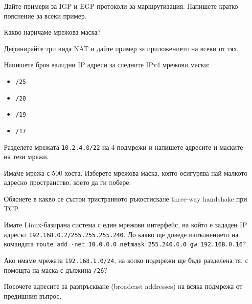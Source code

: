 \begin{questions}
\begin{center}
  \end{center}

  \question Дайте примери за IGP и EGP протоколи за маршрутизация. Напишете
  кратко пояснение за всеки пример.

  \question Какво наричаме мрежова маска?

  \question Дефинирайте три вида NAT и дайте пример за приложението на всеки от
  тях.

  \question Напишете броя валидни IP адреси за следните IPv4 мрежови маски:
  \begin{itemize}
    \item \texttt{/25}
    \item \texttt{/20}
    \item \texttt{/19}
    \item \texttt{/17}
  \end{itemize}

  \question Разделете мрежата \texttt{10.2.4.0/22} на 4 подмрежи и напишете
  адресите и маските на тези мрежи.

  \question Имаме мрежа с 500 хоста. Изберете мрежова маска, която осигурява
  най-малкото адресно пространство, което да ги побере.

  \question Обяснете в какво се състои тристранното ръкостискане
  \foreignlanguage{english}{three-way handshake} при TCP.

  \question Имате Linux-базирана система с един мрежови интерфейс, на който е
  зададен IP адресът \texttt{192.168.0.2/255.255.255.240}. До какво ще доведе
  изпълнението на командата \texttt{route add -net 10.0.0.0 netmask 255.240.0.0
    gw 192.168.0.16}?

  \question Ако имаме мрежата \texttt{192.168.1.0/24}, на колко подмрежи ще бъде
  разделена тя, с помощта на маска с дължина \texttt{/26}?

  \question Посочете адресите за разпръскване
  (\foreignlanguage{english}{broadcast addresses}) на всяка подмрежа от
  предишния въпрос.


\end{questions}
